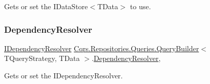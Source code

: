 Gets or set the I\+Data\+Store$<$\+T\+Data$>$ to use. 

\mbox{\label{classCqrs_1_1Repositories_1_1Queries_1_1QueryBuilder_aef22b10001de3e15a2817f8446a5b5f4_aef22b10001de3e15a2817f8446a5b5f4}} 
\subsubsection{\texorpdfstring{Dependency\+Resolver}{DependencyResolver}}
{\footnotesize\ttfamily \hyperlink{interfaceCqrs_1_1Configuration_1_1IDependencyResolver}{I\+Dependency\+Resolver} \hyperlink{classCqrs_1_1Repositories_1_1Queries_1_1QueryBuilder}{Cqrs.\+Repositories.\+Queries.\+Query\+Builder}$<$ T\+Query\+Strategy, T\+Data $>$.\hyperlink{classCqrs_1_1Configuration_1_1DependencyResolver}{Dependency\+Resolver}\hspace{0.3cm}{\ttfamily [get]}, {\ttfamily [protected]}}



Gets or set the I\+Dependency\+Resolver. 

